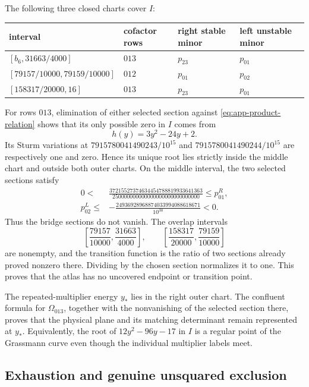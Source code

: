 The following three closed charts cover \(I\):
\begin{center}
\small
\begin{tabular}{llll}
\toprule
interval & cofactor rows & right stable minor & left unstable minor\\
\midrule
\([b_6,31663/4000]\) & \(013\) & \(p_{23}\) & \(p_{01}\)\\
\([79157/10000,79159/10000]\) & \(012\) & \(p_{01}\) & \(p_{02}\)\\
\([158317/20000,16]\) & \(013\) & \(p_{23}\) & \(p_{01}\)\\
\bottomrule
\end{tabular}
\end{center}
For rows \(013\), elimination of either selected section against
\eqref{eq:app-product-relation} shows that its only possible zero in \(I\)
comes from
\[
 h(y)=3y^2-24y+2.
\]
Its Sturm variations at
\(7915780041490243/10^{15}\) and
\(7915780041490244/10^{15}\) are respectively one and zero.  Hence its
unique root lies strictly inside the middle chart and outside both outer
charts.  On the middle interval, the two selected sections satisfy
\begin{align}
0<&\frac{37215527374634454788819933641363}
        {250000000000000000000000000000}
 \leq p_{01}^{R},                                    \label{eq:app-bridge-right}\\
p_{02}^{L}\leq{}&-\frac{24936928968874033994088618671}{10^{30}}<0.
                                                        \label{eq:app-bridge-left}
\end{align}
Thus the bridge sections do not vanish.  The overlap intervals
\[
\left[\frac{79157}{10000},\frac{31663}{4000}\right],
\qquad
\left[\frac{158317}{20000},\frac{79159}{10000}\right]
\]
are nonempty, and the transition function
is the ratio of two sections already proved nonzero there.  Dividing by the
chosen section normalizes it to one.  This proves that the atlas has no
uncovered endpoint or transition point.

The repeated-multiplier energy \(y_*\) lies in the right outer chart.  The
confluent formula for \(\Omega_{013}\), together with the nonvanishing of
the selected section there, proves that the physical plane and its matching
determinant remain represented at \(y_*\).  Equivalently, the root of
\(12y^2-96y-17\) in \(I\) is a regular point of the Grassmann curve even
though the individual multiplier labels meet.

\subsection{Exhaustion and genuine unsquared exclusion}
\label{appsubsec:g6-exhaustion}

